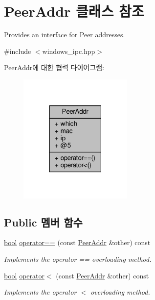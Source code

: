 \hypertarget{class_peer_addr}{}\section{Peer\+Addr 클래스 참조}
\label{class_peer_addr}


Provides an interface for Peer addresses.  




{\ttfamily \#include $<$windows\+\_\+ipc.\+hpp$>$}



Peer\+Addr에 대한 협력 다이어그램\+:
\nopagebreak
\begin{figure}[H]
\begin{center}
\leavevmode
\includegraphics[width=159pt]{class_peer_addr__coll__graph}
\end{center}
\end{figure}
\subsection*{Public 멤버 함수}
\begin{DoxyCompactItemize}
\item 
\hyperlink{avb__gptp_8h_af6a258d8f3ee5206d682d799316314b1}{bool} \hyperlink{class_peer_addr_aa729440f0d336c86fc8729c39df6ad08}{operator==} (const \hyperlink{class_peer_addr}{Peer\+Addr} \&other) const 
\begin{DoxyCompactList}\small\item\em Implements the operator \textquotesingle{}==\textquotesingle{} overloading method. \end{DoxyCompactList}\item 
\hyperlink{avb__gptp_8h_af6a258d8f3ee5206d682d799316314b1}{bool} \hyperlink{class_peer_addr_a7582142069c71ae7f8a9d118a8b3b4b5}{operator$<$} (const \hyperlink{class_peer_addr}{Peer\+Addr} \&other) const 
\begin{DoxyCompactList}\small\item\em Implements the operator \textquotesingle{}$<$\textquotesingle{} overloading method. \end{DoxyCompactList}\end{DoxyCompactItemize}
